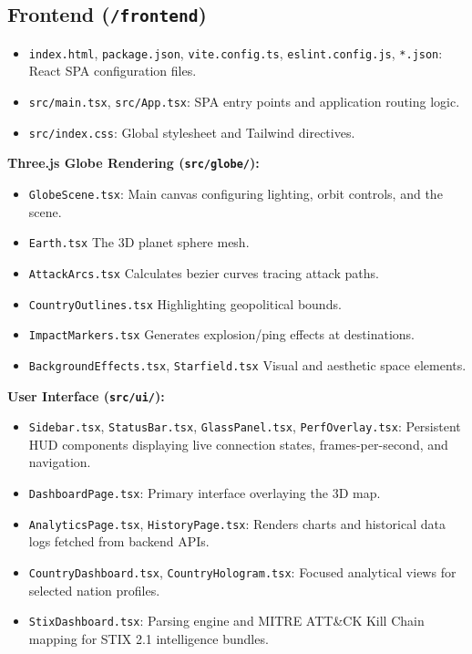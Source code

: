 \documentclass[12pt,a4paper]{article}
\begin{document}
\subsection{Frontend (\texttt{/frontend})}
\begin{itemize}[noitemsep]
    \item \verb|index.html|, \verb|package.json|, \verb|vite.config.ts|, \verb|eslint.config.js|, \verb|*.json|: React SPA configuration files.
    \item \verb|src/main.tsx|, \verb|src/App.tsx|: SPA entry points and application routing logic.
    \item \verb|src/index.css|: Global stylesheet and Tailwind directives.
\end{itemize}
\textbf{Three.js Globe Rendering (\texttt{src/globe/}):}
\begin{itemize}[noitemsep]
    \item \verb|GlobeScene.tsx|: Main canvas configuring lighting, orbit controls, and the scene.
    \item \verb|Earth.tsx| \textemdash{} The 3D planet sphere mesh.
    \item \verb|AttackArcs.tsx| \textemdash{} Calculates bezier curves tracing attack paths.
    \item \verb|CountryOutlines.tsx| \textemdash{} Highlighting geopolitical bounds.
    \item \verb|ImpactMarkers.tsx| \textemdash{} Generates explosion/ping effects at destinations.
    \item \verb|BackgroundEffects.tsx|, \verb|Starfield.tsx| \textemdash{} Visual and aesthetic space elements.
\end{itemize}
\textbf{User Interface (\texttt{src/ui/}):}
\begin{itemize}[noitemsep]
    \item \verb|Sidebar.tsx|, \verb|StatusBar.tsx|, \verb|GlassPanel.tsx|, \verb|PerfOverlay.tsx|: Persistent HUD components displaying live connection states, frames-per-second, and navigation.
    \item \verb|DashboardPage.tsx|: Primary interface overlaying the 3D map.
    \item \verb|AnalyticsPage.tsx|, \verb|HistoryPage.tsx|: Renders charts and historical data logs fetched from backend APIs.
    \item \verb|CountryDashboard.tsx|, \verb|CountryHologram.tsx|: Focused analytical views for selected nation profiles.
    \item \verb|StixDashboard.tsx|: Parsing engine and MITRE ATT\&CK Kill Chain mapping for STIX 2.1 intelligence bundles.
\end{itemize}
\end{document}
